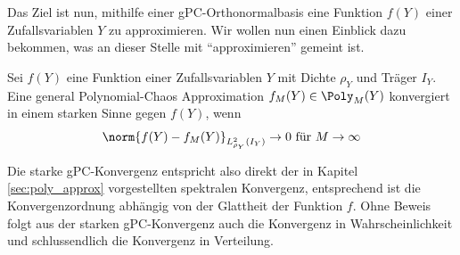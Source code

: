 Das Ziel ist nun, mithilfe einer gPC-Orthonormalbasis eine Funktion $f(Y)$ einer Zufallsvariablen $Y$ zu approximieren. Wir wollen nun einen Einblick dazu bekommen, was an dieser Stelle mit "`approximieren"' gemeint ist.
\begin{mathdef}
Sei $f(Y)$ eine Funktion einer Zufallsvariablen $Y$ mit Dichte $\rho_Y$ und Träger $I_Y$. Eine general Polynomial-Chaos Approximation $f_M(Y)\in\Poly_M(Y)$ konvergiert in einem starken Sinne gegen $f(Y)$, wenn \[\norm{f(Y)-f_M(Y)}_{L_{\rho_Y}^2(I_Y)}\to 0\text{ für }{M\to\infty}\]
\end{mathdef}
Die starke gPC-Konvergenz entspricht also direkt der in Kapitel \ref{sec:poly_approx} vorgestellten spektralen Konvergenz, entsprechend ist die Konvergenzordnung abhängig von der Glattheit der Funktion $f$. Ohne Beweis folgt aus der starken gPC-Konvergenz auch die Konvergenz in Wahrscheinlichkeit und schlussendlich die Konvergenz in Verteilung.
